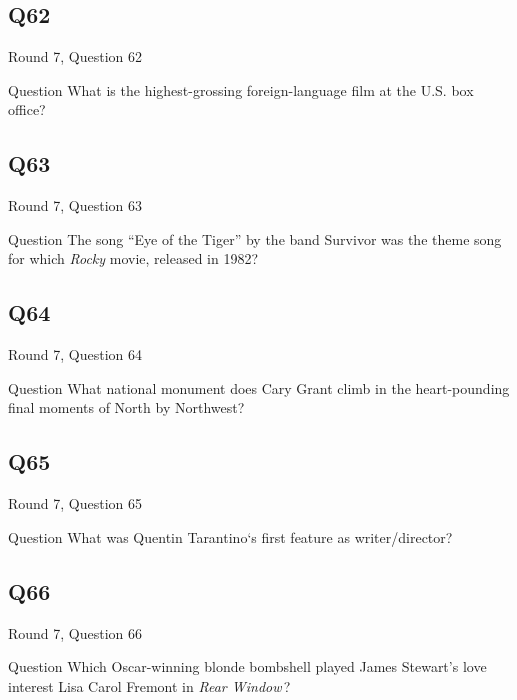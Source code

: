 \documentclass[11pt]{beamer}
\begin{document}
\subsection*{Q62}
\begin{frame}[t]{Round 7, Question 62}
\vspace{2em}
\begin{block}{Question}
What is the highest-grossing foreign-language film at the U.S. box office?
\end{block}
\end{frame}
    

\subsection*{Q63}
\begin{frame}[t]{Round 7, Question 63}
\vspace{2em}
\begin{block}{Question}
The song ``Eye of the Tiger'' by the band Survivor was the theme song for which \emph{Rocky} movie, released in 1982?
\end{block}
\end{frame}
    

\subsection*{Q64}
\begin{frame}[t]{Round 7, Question 64}
\vspace{2em}
\begin{block}{Question}
What national monument does Cary Grant climb in the heart-pounding final moments of North by Northwest?
\end{block}
\end{frame}
    

\subsection*{Q65}
\begin{frame}[t]{Round 7, Question 65}
\vspace{2em}
\begin{block}{Question}
What was Quentin Tarantino`s first feature as writer/director?
\end{block}
\end{frame}
    

\subsection*{Q66}
\begin{frame}[t]{Round 7, Question 66}
\vspace{2em}
\begin{block}{Question}
Which Oscar-winning blonde bombshell played James Stewart's love interest Lisa Carol Fremont in \emph{Rear Window}\,?
\end{block}
\end{frame}
    
\end{document}
